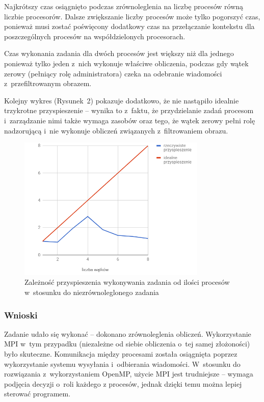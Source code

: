 \documentclass[a4paper,12pt]{article}
\begin{document}
Najkrótszy czas osiągnięto podczas zrównoleglenia na liczbę procesów równą liczbie procesorów. Dalsze zwiększanie liczby procesów może tylko pogorszyć czas, ponieważ musi zostać poświęcony dodatkowy czas na przełączanie kontekstu dla poszczególnych procesów na współdzielonych procesorach.

Czas wykonania zadania dla dwóch procesów jest większy niż dla jednego ponieważ tylko jeden z~nich wykonuje właściwe obliczenia, podczas gdy wątek zerowy (pełniący rolę administratora) czeka na odebranie wiadomości z~przefiltrowanym obrazem.

Kolejny wykres (Rysunek~2) pokazuje dodatkowo, że nie nastąpiło idealnie trzykrotne przyspieszenie -- wynika to z~faktu, że przydzielanie zadań procesom i~zarządzanie nimi także wymaga zasobów oraz tego, że wątek zerowy pełni rolę nadzorującą i~nie wykonuje obliczeń związanych z~filtrowaniem obrazu.

\begin{figure}[!hbtp]
  \centering
  \includegraphics[width=0.8\textwidth]{wykres2.png}
  \caption{Zależność przyspieszenia wykonywania zadania od ilości procesów w~stosunku do niezrównoleglonego zadania}
\end{figure}

\subsubsection*{Wnioski }
Zadanie udało się wykonać -- dokonano zrównoleglenia obliczeń. Wykorzystanie MPI w~tym przypadku (niezależne od siebie obliczenia o~tej samej złożoności) było skuteczne. Komunikacja między procesami została osiągnięta poprzez wykorzystanie systemu wysyłania i~odbierania wiadomości. W~stosunku do rozwiązania z~wykorzystaniem OpenMP, użycie MPI jest trudniejsze -- wymaga podjęcia decyzji o~roli każdego z procesów, jednak dzięki temu można lepiej sterować programem.
\end{document}
